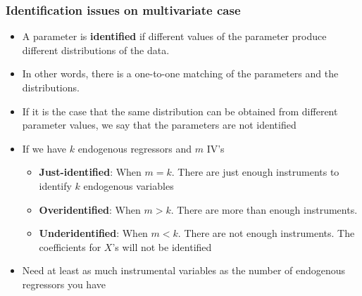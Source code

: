 \documentclass[aspectratio=169]{beamer}
\begin{document}
\begin{frame}
\frametitle{Identification issues on multivariate case}
\begin{itemize}
\item A parameter is \textbf{identified} if different values of the parameter produce different distributions of the data. 
\item In other words, there is a one-to-one matching of the parameters and the distributions.
\item If it is the case that the same distribution can be obtained from different parameter values, we say that the parameters are not identified
\item If we have $k$ endogenous regressors and $m$ IV's
\begin{itemize}
\item \textbf{Just-identified}: When $m=k$. There are just enough instruments to identify $k$ endogenous variables
\item \textbf{Overidentified}: When $m>k$. There are more than enough instruments.\item \textbf{Underidentified}: When $m<k$. There are not enough instruments. The coefficients for $X$'s will not be identified 
\end{itemize}
\item Need at least as much instrumental variables as the number of endogenous regressors you have
\end{itemize}
\end{frame}
\end{document}
